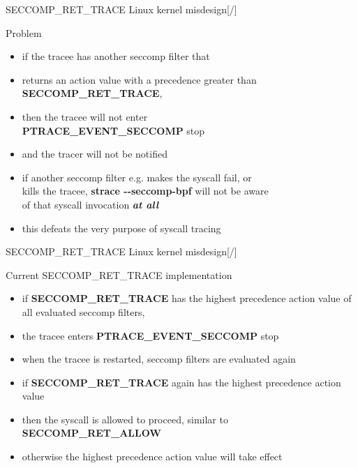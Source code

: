 \documentclass[unicode,aspectratio=169,xcolor={table,dvipsnames,usernames}]{beamer}
\begin{document}
\begin{frame}{\Large SECCOMP\_RET\_TRACE Linux kernel misdesign\hfill [\insertframenumber/\inserttotalframenumber]}
\Large
\begin{block}{Problem}
\begin{itemize}
	\item if the tracee has another seccomp filter that
	\item returns an action value with a precedence greater than \textbf{SECCOMP\_RET\_TRACE},
	\item then the tracee will not enter \\
		\textbf{PTRACE\_EVENT\_SECCOMP} stop
	\item and the tracer will not be notified
	\item if another seccomp filter e.g. makes the syscall fail, or \\
		kills the tracee, \textbf{strace -{}-seccomp-bpf} will not be aware \\
		of that syscall invocation \textbf{\textit{at all}}
	\item this defeats the very purpose of syscall tracing
\end{itemize}
\end{block}
\end{frame}

\begin{frame}{\Large SECCOMP\_RET\_TRACE Linux kernel misdesign\hfill [\insertframenumber/\inserttotalframenumber]}
\Large
\begin{block}{Current SECCOMP\_RET\_TRACE implementation}
\begin{itemize}
	\item if \textbf{SECCOMP\_RET\_TRACE} has the highest precedence action value of all evaluated seccomp filters,
	\item the tracee enters \textbf{PTRACE\_EVENT\_SECCOMP} stop
	\item when the tracee is restarted, seccomp filters are evaluated again
	\item if \textbf{SECCOMP\_RET\_TRACE} again has the highest precedence action value
	\item then the syscall is allowed to proceed, similar to \textbf{SECCOMP\_RET\_ALLOW}
	\item otherwise the highest precedence action value will take effect
\end{itemize}
\end{block}
\end{frame}
\end{document}
